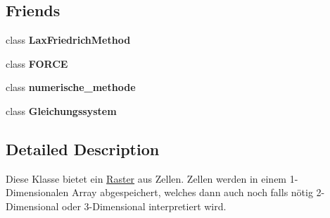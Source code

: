 \subsection*{Friends}
\begin{DoxyCompactItemize}
\item 
\hypertarget{classRaster_ac3a93c7be244a347baca556a11308dff}{class {\bfseries Lax\-Friedrich\-Method}}\label{classRaster_ac3a93c7be244a347baca556a11308dff}

\item 
\hypertarget{classRaster_ae9fe591339485bbebff144d415b51f92}{class {\bfseries F\-O\-R\-C\-E}}\label{classRaster_ae9fe591339485bbebff144d415b51f92}

\item 
\hypertarget{classRaster_a666b267246fbdf25ca4116e5657ca777}{class {\bfseries numerische\-\_\-methode}}\label{classRaster_a666b267246fbdf25ca4116e5657ca777}

\item 
\hypertarget{classRaster_af58ecbc0668f0a95d4fa3303a3ab171e}{class {\bfseries Gleichungssystem}}\label{classRaster_af58ecbc0668f0a95d4fa3303a3ab171e}

\end{DoxyCompactItemize}


\subsection{Detailed Description}
Diese Klasse bietet ein \hyperlink{classRaster}{Raster} aus Zellen. Zellen werden in einem 1-\/\-Dimensionalen Array abgespeichert, welches dann auch noch falls nötig 2-\/\-Dimensional oder 3-\/\-Dimensional interpretiert wird. 


